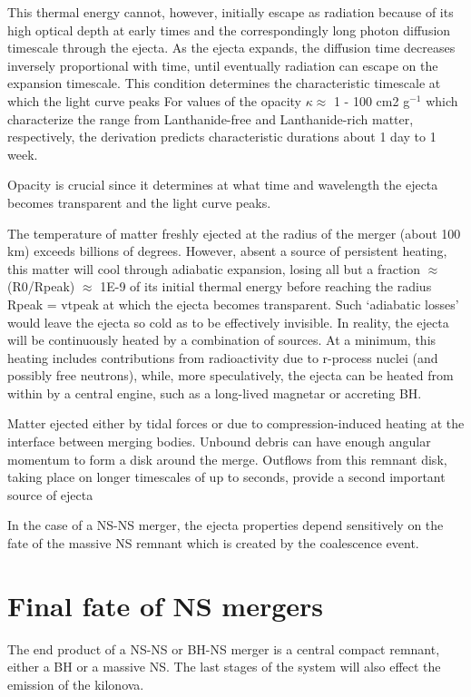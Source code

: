 This thermal energy cannot, however, initially escape as radiation because of its high optical depth at early times
and the correspondingly long photon diffusion timescale through the ejecta. 
As the ejecta expands, the diffusion time decreases inversely proportional with time, until eventually radiation can escape on the expansion timescale.
This condition determines the characteristic timescale at which the light curve peaks
For values of the opacity $\kappa \approx$ 1 - 100 cm2 g${}^{-1}$ which characterize the range from Lanthanide-free and Lanthanide-rich matter, respectively, the derivation predicts characteristic durations about 1 day to 1 week.

Opacity is crucial since it determines at what time and wavelength the ejecta becomes transparent and the light curve peaks. 

The temperature of matter freshly ejected at the radius of the merger (about 100 km) exceeds billions of degrees. 
However, absent a source of persistent heating, this matter will cool through adiabatic expansion, losing all but a fraction $\approx$ (R0/Rpeak) $\approx$ 1E-9 of its initial thermal energy before reaching the radius Rpeak = vtpeak at which the ejecta becomes transparent.
Such `adiabatic losses' would leave the ejecta so cold as to be effectively invisible.
In reality, the ejecta will be continuously heated by a combination of sources. 
At a minimum, this heating includes contributions from radioactivity due to r-process nuclei (and possibly free neutrons), while, more speculatively, the ejecta can be heated from within by a central engine, such as a long-lived magnetar or accreting BH.

Matter ejected either by tidal forces or due to compression-induced heating at the interface between merging bodies.
Unbound debris can have enough angular momentum to form a disk around the merge.
Outflows from this remnant disk, taking place on longer timescales of up to seconds, provide a second important source of ejecta

In the case of a NS-NS merger, the ejecta properties depend sensitively on the fate of the massive NS remnant which is created by the coalescence event.

\section{Final fate of NS mergers}

The end product of a NS-NS or BH-NS merger is a central compact remnant, either a BH or a massive NS. 
The last stages of the system will also effect the emission of the kilonova.

